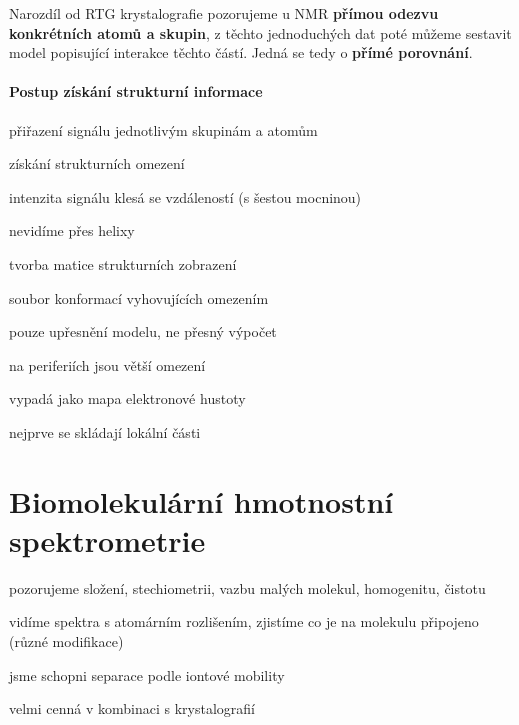 \documentclass[DIV=8]{scrreprt}
\begin{document}
Narozdíl od RTG krystalografie pozorujeme u NMR \textbf{přímou odezvu konkrétních atomů a skupin}, z těchto jednoduchých dat poté můžeme sestavit model popisující interakce těchto částí. Jedná se tedy o \textbf{přímé porovnání}.

\paragraph{Postup získání strukturní informace}
\begin{myEnumerate}[nosep]
    \item přiřazení signálu jednotlivým skupinám a atomům
    \item získání strukturních omezení
\begin{myItemize}[nosep]
    \item intenzita signálu klesá se vzdáleností (s šestou mocninou)
    \item nevidíme přes helixy
\end{myItemize}

    \item tvorba matice strukturních zobrazení
\begin{myItemize}[nosep]
    \item soubor konformací vyhovujících omezením
\begin{myItemize}[nosep]
    \item pouze upřesnění modelu, ne přesný výpočet
    \item na periferiích jsou větší omezení
\end{myItemize}

    \item vypadá jako mapa elektronové hustoty
    \item nejprve se skládají lokální části
\end{myItemize}

\end{myEnumerate}



\section{Biomolekulární hmotnostní spektrometrie} \label{Biomolekulární hmotnostní spektrometrie} \FloatBarrier


\begin{myItemize}[nosep]
    \item pozorujeme složení, stechiometrii, vazbu malých molekul, homogenitu, čistotu
    \item vidíme spektra s atomárním rozlišením, zjistíme co je na molekulu připojeno (různé modifikace)
    \item jsme schopni separace podle iontové mobility
    \item velmi cenná v kombinaci s krystalografií
\end{myItemize}
\end{document}
